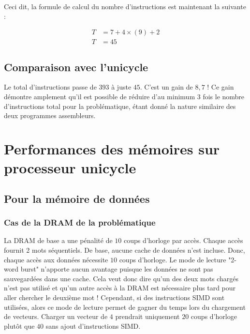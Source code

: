 \documentclass[a11paper]{article}
\newcommand{\todo}[1]{\begin{color}{Red}\textbf{TODO:} #1\end{color}}
\begin{document}
Ceci dit, la formule de calcul du nombre d'instructions est maintenant la
suivante :

\begin{align}
  T &= 7 + 4\times(9) + 2 \\
  T &= 45
\end{align}

\subsection{Comparaison avec l'unicycle}

Le total d'instructions passe de $393$ à juste $45$. C'est un gain de $8{,}7$ !
Ce gain démontre amplement qu'il est possible de réduire d'au minimum $3$ fois
le nombre d'instructions total pour la problématique, étant donné la nature
similaire des deux programmes assembleurs.






\section{Performances des mémoires sur processeur unicycle}

\subsection{Pour la mémoire de données}

\subsubsection{Cas de la DRAM de la problématique}

La DRAM de base a une pénalité de $10$ coups d'horloge par accès. Chaque accès
fournit 2 mots séquentiels. De base, aucune cache de données n’est incluse.
Donc, chaque accès aux données nécessite $10$ coups d'horloge. Le mode de
lecture "2-word burst" n’apporte aucun avantage puisque les données ne sont pas
sauvegardées dans une cache. Cela veut donc dire qu’un des deux mots chargés
n’est pas utilisé et qu’un autre accès à la DRAM est nécessaire plus tard pour
aller chercher le deuxième mot ! Cependant, si des instructions SIMD sont
utilisées, alors ce mode de lecture permet de gagner du temps lors du
chargement de vecteurs. Charger un vecteur de $4$ prendrait uniquement $20$
coups d’horloge plutôt que $40$ sans ajout d’instructions SIMD.
\end{document}

